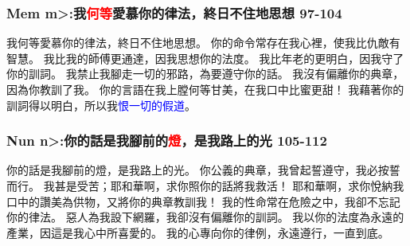 \subsubsection{Mem  \<m>:我\textcolor{red}{何等}愛慕你的律法，終日不住地思想 97-104}
我何等愛慕你的律法，終日不住地思想。
你的命令常存在我心裡，使我比仇敵有智慧。
我比我的師傅更通達，因我思想你的法度。
我比年老的更明白，因我守了你的訓詞。
我禁止我腳走一切的邪路，為要遵守你的話。
我沒有偏離你的典章，因為你教訓了我。
你的言語在我上膛何等甘美，在我口中比蜜更甜！
我藉著你的訓詞得以明白，所以我\textcolor{blue}{恨一切的假道}。


\subsubsection{Nun  \<n>:你的話是我腳前的\textcolor{red}{燈}，是我路上的光 105-112}
你的話是我腳前的燈，是我路上的光。
你公義的典章，我曾起誓遵守，我必按誓而行。
我甚是受苦；耶和華啊，求你照你的話將我救活！
耶和華啊，求你悅納我口中的讚美為供物，又將你的典章教訓我！
我的性命常在危險之中，我卻不忘記你的律法。
惡人為我設下網羅，我卻沒有偏離你的訓詞。
我以你的法度為永遠的產業，因這是我心中所喜愛的。
我的心專向你的律例，永遠遵行，一直到底。


